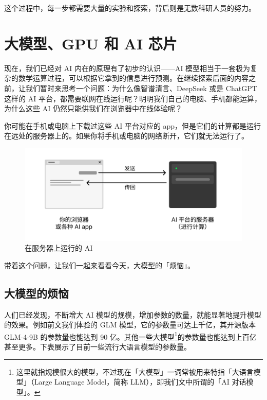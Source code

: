 这个过程中，每一步都需要大量的实验和探索，背后则是无数科研人员的努力。

\section{大模型、GPU 和 AI 芯片}

现在，我们已经对 AI 内在的原理有了初步的认识——AI 模型相当于一套极为复杂的数学运算过程，可以根据它拿到的信息进行预测。在继续探索后面的内容之前，让我们暂时来思考一个问题：为什么像智谱清言、DeepSeek 或是 ChatGPT 这样的 AI 平台，都需要联网在线运行呢？明明我们自己的电脑、手机都能运算，为什么这些 AI 仍然只能供我们在浏览器中在线体验呢？

\begin{note}
  你可能在手机或电脑上下载过这些 AI 平台对应的 app，但是它们的计算都是运行在远处的服务器上的。如果你将手机或电脑的网络断开，它们就无法运行了。
\end{note}

\begin{figure}[htb!]
  \centering
  \includegraphics[width=.6\textwidth]{assets/surpass/AI_running_on_server.pdf}
  \caption{在服务器上运行的 AI}
  \label{fig:AI_running_on_server}
\end{figure}

带着这个问题，让我们一起来看看今天，大模型的「烦恼」。

\subsection{大模型的烦恼}

人们已经发现，不断增大 AI 模型的规模，增加参数的数量，就能显著地提升模型的效果。例如前文我们体验的 GLM 模型，它的参数量可达上千亿，其开源版本 GLM-4-9B 的参数量也能达到 90 亿。其他一些大模型\footnote{这里就指规模很大的模型，不过现在「大模型」一词常被用来特指「大语言模型」（Large Language Model，简称 LLM），即我们文中所谓的「AI 对话模型」。}的参数量也能达到上百亿甚至更多。下表展示了目前一些流行大语言模型的参数量。


